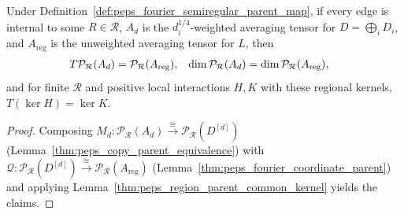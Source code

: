 \begin{lemma}%
    \label{thm:peps_fourier_semiregular_parent}
    \leanok
    Under Definition~\ref{def:peps_fourier_semiregular_parent_map}, if every edge is internal to some $R\in\mathcal R$, $A_d$ is the $d_i^{1/4}$-weighted averaging tensor for $D=\bigoplus_iD_i$, and $A_{\mathrm{reg}}$ is the unweighted averaging tensor for $L$, then
    \begin{align}
        T\mathcal P_{\mathcal R}(A_d) & =
        \mathcal P_{\mathcal R}(A_{\mathrm{reg}}),
                                      & \dim\mathcal P_{\mathcal R}(A_d) & =
        \dim\mathcal P_{\mathcal R}(A_{\mathrm{reg}}), \notag
    \end{align}
    and for finite $\mathcal R$ and positive local interactions $H,K$ with these regional kernels, $T(\ker H)=\ker K$.
\end{lemma}
\begin{proof}\leanok
    Composing $M_d:\mathcal P_{\mathcal R}(A_d)\xrightarrow{\cong}\mathcal P_{\mathcal R}(D^{[d]})$ (Lemma~\ref{thm:peps_copy_parent_equivalence}) with $\mathcal Q:\mathcal P_{\mathcal R}(D^{[d]})\xrightarrow{\cong}\mathcal P_{\mathcal R}(A_{\mathrm{reg}})$ (Lemma~\ref{thm:peps_fourier_coordinate_parent}) and applying Lemma~\ref{thm:peps_region_parent_common_kernel} yields the claims.
\end{proof}


